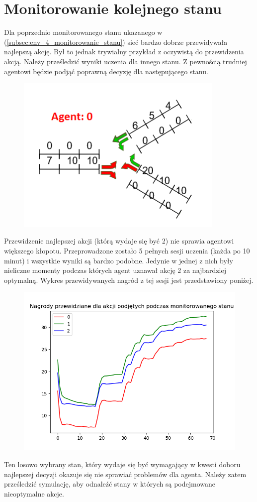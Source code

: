\documentclass[12pt]{book}
\theoremstyle{plain}
\begin{document}
\section{Monitorowanie kolejnego stanu}	
	Dla poprzednio monitorowanego stanu ukazanego w (\ref{subsec:env_4_monitorowanie_stanu}) sieć bardzo dobrze przewidywała najlepszą akcję. Był to jednak trywialny przykład z oczywistą do przewidzenia akcją. Należy prześledzić wyniki uczenia dla innego stanu. Z pewnością trudniej agentowi będzie podjąć poprawną decyzję dla następującego stanu. 
	\begin{figure}[H]
		\centering
		\includegraphics[width=10cm]{env_4_monitorowany_stan_2.png}
		\label{fig:env_4_monitorowany_stan_2.png}
	\end{figure}
	
	Przewidzenie najlepszej akcji (którą wydaje się być 2) nie sprawia agentowi większego kłopotu. Przeprowadzone zostało 5 pełnych sesji uczenia (każda po 10 minut) i wszystkie wyniki są bardzo podobne. Jedynie w jednej z nich były nieliczne momenty podczas których agent uznawał akcję 2 za najbardziej optymalną. Wykres przewidywanych nagród z tej sesji jest przedstawiony poniżej.  
	\begin{figure}[H]
		\includegraphics[width=20cm]{env_4_monitorowany_stan_2_ucz.png}
		\label{fig:env_4_monitorowany_stan_2_ucz.png}
	\end{figure}

Ten losowo wybrany stan, który wydaje się być wymagający w kwesti doboru najlepszej decyzji okazuje się nie sprawiać problemów dla agenta. Należy zatem prześledzić symulację, aby odnaleźć stany w których są podejmowane nieoptymalne akcje.
	
\end{document}
